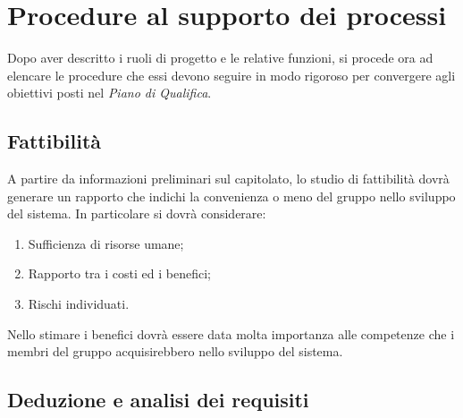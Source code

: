 \section{Procedure al supporto dei processi}{
Dopo aver descritto i ruoli di progetto e le relative funzioni, si procede ora ad elencare le procedure che essi devono seguire in modo rigoroso per convergere agli obiettivi posti nel \textit{Piano di Qualifica}.
	\subsection{Fattibilità}{
		A partire da informazioni preliminari sul capitolato, lo studio di fattibilità dovrà generare un rapporto che indichi la convenienza o meno del gruppo nello sviluppo del sistema. In particolare si dovrà considerare:
		\begin{enumerate}
			\item Sufficienza di risorse umane;
			\item Rapporto tra i costi ed i benefici;
			\item Rischi individuati.
		\end{enumerate}
		Nello stimare i benefici dovrà essere data molta importanza alle competenze che i membri del gruppo acquisirebbero nello sviluppo del sistema.
	 }
	\subsection{Deduzione e analisi dei requisiti}{ 
}}
